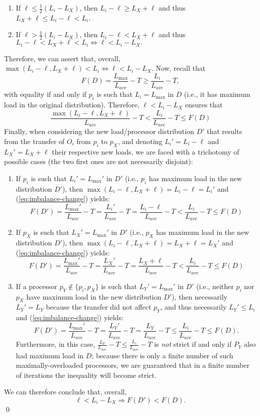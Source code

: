 \begin{enumerate}
\item
If $\ell \le \frac{1}{2}(L_i-L_X)$, then $L_i-\ell\ge{}L_X+\ell$ and
thus $L_X+\ell\le L_i-\ell < L_i$.
\item
If $\ell > \frac{1}{2}(L_i-L_X)$, then $L_i-\ell<L_X+\ell$ and
thus $L_i-\ell < L_X+\ell < L_i \Leftrightarrow \ell < L_i - L_X.$
\end{enumerate}
Therefore, we can assert that, overall,
$\max{(L_i-\ell, L_X+\ell)} < L_i \Leftrightarrow \ell < L_i - L_X$.
Now, recall that
\[
F(D) = \frac{L_{\max}}{L_{ave}} - T
\ge \frac{L_i}{L_{ave}} - T,
\]
with equality if and only if $p_i$ is such that $L_i=L_{\max}$ in $D$
(i.e., it has maximum load in the original distribution).
Therefore, $\ell<L_i-L_X$ ensures that
\begin{equation}
\label{eq:imbalance-change}
\frac{\max{(L_i-\ell, L_X+\ell)}}{L_{ave}} -T
< \frac{L_i}{L_{ave}} - T \le F(D)
\end{equation}
Finally, when considering the new load/processor distribution $D'$ that
results from the transfer of $O_i$ from $p_i$ to $p_X$, and denoting
$L_i'=L_i-\ell$ and $L_X'=L_X+\ell$ their respective new loads, we are faced
with a trichotomy of possible cases (the two first ones are not necessarily disjoint):
\begin{enumerate}
\item
If $p_i$ is such that $L_i'=L_{\max}'$ in $D'$ (i.e., $p_i$ has
maximum load in the new distribution $D'$), then
$\max{(L_i-\ell,L_X+\ell)}=L_i-\ell=L_i'$ and
(\ref{eq:imbalance-change}) yields:
\[
F(D') = \frac{L_{\max}'}{L_{ave}} - T
 = \frac{L_i'}{L_{ave}} - T = \frac{L_i -\ell}{L_{ave}} - T
< \frac{L_i}{L_{ave}} - T \le F(D)
\]
\item
If $p_X$ is such that $L_X'=L_{\max}'$ in $D'$ (i.e., $p_X$ has
maximum load in the new distribution $D'$), then
$\max{(L_i-\ell,L_X+\ell)}=L_X+\ell=L_X'$ and
(\ref{eq:imbalance-change}) yields:
\[
F(D') = \frac{L_{\max}'}{L_{ave}} - T
 = \frac{L_X'}{L_{ave}} - T  = \frac{L_X+\ell}{L_{ave}} - T
< \frac{L_i}{L_{ave}} - T \le F(D)
\]
\item
If a processor $p_Y\not\in\{p_i,p_X\}$ is such that $L_Y'=L_{\max}'$
in $D'$ (i.e., neither $p_i$ nor $p_X$ have maximum load in the new
distribution $D'$), then necessarily $L_Y'=L_Y$ because the transfer did not
affect $p_Y$, and thus necessarily $L_Y'\le{}L_i$ and
(\ref{eq:imbalance-change}) yields:
\[
F(D') = \frac{L_{\max}'}{L_{ave}} - T
 = \frac{L_Y'}{L_{ave}} - T  = \frac{L_Y}{L_{ave}} - T
\le \frac{L_i}{L_{ave}} - T \le F(D).
\]
Furthermore, in this case,
$\frac{L_Y}{L_{ave}}-T\le\frac{L_i}{L_{ave}}-T$ is \emph{not} strict
if and only if $P_Y$ also had maximum load in $D$; because there is
only a finite number of such maximally-overloaded processors, we are
guaranteed that in a finite number of iterations the inequality will
become strict.
\end{enumerate}
We can therefore conclude that, overall,
\[
\ell < L_i - L_X \Longrightarrow F(D') < F(D).
\]
\hfill\qed\\

